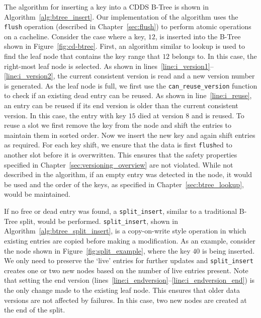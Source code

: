 The algorithm for inserting a key into a CDDS B-Tree is shown in
Algorithm~\ref{alg:btree_insert}. Our implementation of the algorithm
uses the \texttt{flush} operation (described in Chapter~\ref{sec:flush}) 
to perform atomic operations on a cacheline. Consider the case where a 
key, $12$, is inserted into the B-Tree shown in Figure~\ref{fig:cd-btree}. 
First, an algorithm similar to lookup is used to find the leaf node that
contains the key range that $12$ belongs to. In this case, the
right-most leaf node is selected. As shown in
lines~\ref{line:i_version1}--\ref{line:i_version2}, the current
consistent version is read and a new version number is generated. As
the leaf node is full, we first use the \texttt{can\_reuse\_version}
function to check if an existing dead entry can be reused.  As shown
in line~\ref{line:i_reuse}, an entry can be reused if its end
version is older than the current consistent version. In this
case, the entry with key $15$ died at version $8$ and is reused.
To reuse a slot we first remove the key from the node and shift the
entries to maintain them in sorted order. Now we insert the new key
and again shift entries as required. For each key shift, we ensure 
that the data is first \texttt{flush}ed to another slot before it is 
overwritten. This ensures that the safety properties specified in
Chapter~\ref{sec:versioning_overview} are not violated.
While not described in the algorithm, if an empty entry was detected
in the node, it would be used and the order of the keys,
as specified in Chapter~\ref{sec:btree_lookup}, would be maintained.  




If no free or dead entry was found, a \texttt{split\_insert}, similar
to a traditional B-Tree split, would be performed. \texttt{split\_insert},
shown in Algorithm~\ref{alg:btree_split_insert}, is a copy-on-write style
operation in which existing entries are copied before making a
modification. As an example, consider the node shown in 
Figure~\ref{fig:split_example}, where the key $40$ is being inserted.  
We only need to preserve the `live' entries for further updates and 
\texttt{split\_insert} creates one or two new nodes based on the number
of live entries present. Note that setting the end version
(lines~\ref{line:i_endversion}--\ref{line:i_endversion_end}) is the
only change made to the existing leaf node. This ensures that older
data versions are not affected by failures. In this case, two new
nodes are created at the end of the split.

